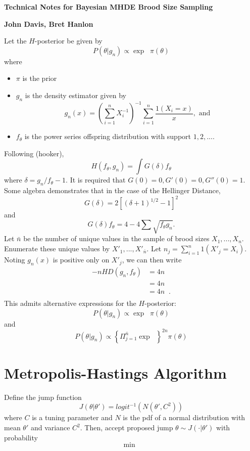 \documentclass[11 pt]{article}
\renewcommand{\th}{\theta}
\newcommand{\fbr}[1]{ \mathop{ \left\{ #1 \right\} } }
\newcommand{\Title}[1]{\begin{center}{\Large \bf #1} \end{center}}
\newcommand{\fth}{f_{\th}}
\begin{document}
\Title{Technical Notes for Bayesian MHDE Brood Size Sampling}

\Title{John Davis, Bret Hanlon}


Let the $H$-posterior be given by
\[
P(\th | g_n) \propto \exp \fbr{ -n H(\fth,g_n) } \pi(\th)
\]
where
\begin{itemize}
  \item $\pi$ is the prior
  \item $g_n$ is the density estimator given by
\[
g_n(x) = \left ( \sum_{i=1}^n X_i^{-1} \right )^{-1} \sum_{i=1}^n \frac{1(X_i=x)}{x}, \text{ and}
\]
  \item $\fth$ is the power series offspring distribution with support $1,2,...$.
\end{itemize}
Following (hooker), 
\[
H(\fth,g_n) = \int G(\delta) \fth
\]
where $\delta = g_n / \fth - 1$. It is required that $G(0)=0, G'(0)=0, G''(0)=1$. Some algebra demonstrates that in the case of the Hellinger Distance, 
\[
G(\delta) = 2[(\delta + 1)^{1/2} - 1]^2
\]
and
\[
G(\delta)\fth = 4 - 4 \sum \sqrt{\fth g_n}.
\]
Let $\bar{n}$ be the number of unique values in the sample of brood sizes $X_1,...,X_n$. Enumerate these unique values by $X'_1,..., X'_{\bar{n}}$. Let $n_j = \sum_{i=1}^n 1(X'_j = X_i)$. Noting $g_n(x)$ is positive only on $X'_j$, we can then write
\begin{align*}
-n HD(g_n,\fth) &= 4n \fbr{ \sum_x \sqrt{\fth g_n} - 1 } \\
&= 4n \fbr{ \sum_x \sqrt{\fth \left ( \sum_{i=1}^n X_i^{-1} \right )^{-1} \sum_{i=1}^n \frac{1(X_i=x)}{X_i} } - 1 } \\
&= 4n \fbr{ \sum_{j=1}^{\bar{n}} \sqrt{\fth   \frac{ n_j(X'_j)^{-1}}{\sum_{k=1}^{\bar{n}} n_k (X'_k)^{-1}} }   - 1 }. \\
\end{align*}
This admits alternative expressions for the $H$-posterior:
\[
P(\th | g_n ) \propto \exp \fbr{ 4n \sum_{j=1}^{\bar{n}} \sqrt{\fth   \frac{ n_j(X'_j)^{-1}}{\sum_{k=1}^{\bar{n}} n_k (X'_k)^{-1}} } } \pi(\th)
\]
and
\[
P(\th | g_n ) \propto \left \{ \Pi_{j=1}^{\bar{n}}  \exp \fbr{ \fth   \frac{ n_j(X'_j)^{-1}}{\sum_{k=1}^{\bar{n}} n_k (X'_k)^{-1} } } \right \}^{2n} \pi(\th) 
\]

\section*{Metropolis-Hastings Algorithm}

Define the jump function
\[
J(\th|\th') = logit^{-1}(N(\th',C^2))
\]
where $C$ is a tuning parameter and $N$ is the pdf of a normal distribution with mean $\th'$ and variance $C^2$. Then, accept proposed jump $\th \sim J(\cdot | \th')$ with probability 
\[
\min \fbr{ \frac{P(\th|g_n) J(\th'|\th)}{P(\th'|g_n) J(\th|\th')}  , 1 }
\]
\end{document}
